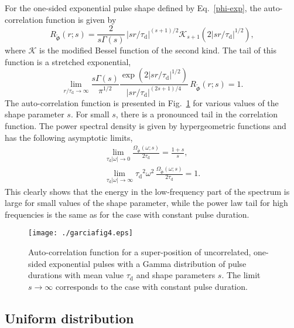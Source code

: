 \documentclass[aps,prb,12pt,a4paper,preprint,amsmath,amssymb,groupedaddress]{revtex4-1}
\newcommand{\abs}[1]{{\left|#1\right|}}\newcommand{\order}[1]{{\mathcal{O}\left(#1\right)}}
\newcommand{\taud}{\ensuremath{\tau_\text{d}}}
\newcommand{\Phiwt}{\ensuremath{\widetilde{\Phi}}}
\newcommand{\Eqref}[1]{Eq.~\eqref{#1}}
\newcommand{\Figref}[1]{Fig.~\ref{#1}}
\begin{document}
For the one-sided exponential pulse shape defined by \Eqref{phi-exp}, the auto-correlation function is given by
\begin{equation}
R_{\Phiwt}(r;s) = \frac{2}{s\Gamma(s)}\,\abs{sr/\taud}^{(s+1)/2} \mathcal{K}_{s+1}(2\abs{sr/\taud}^{1/2}) ,
\end{equation}
where $\mathcal{K}$ is the modified Bessel function of the second kind. The tail of this function is a stretched exponential,
\begin{equation}
\lim_{r/\taud\rightarrow\infty} \frac{s\Gamma(s)}{\pi^{1/2}} \frac{\exp\left( 2\abs{sr/\taud}^{1/2} \right)}{\abs{sr/\taud}^{(2s+1)/4}}\,R_{\Phiwt}(r;s) = 1 .
\end{equation}
The auto-correlation function is presented in \Figref{fig:acf-gamma} for various values of the shape parameter $s$. For small $s$, there is a pronounced tail in the correlation function. The power spectral density is given by hypergeometric functions and has the following asymptotic limits,
\begin{gather}
\lim_{\taud\abs{\omega}\rightarrow0} \frac{\Omega_{\Phiwt}(\omega;s)}{2\taud} = \frac{1+s}{s} ,
\\
\lim_{\taud\abs{\omega}\rightarrow\infty} \taud^2\omega^2\,\frac{\Omega_{\Phiwt}(\omega;s)}{2\taud} = 1 .
\end{gather}
This clearly shows that the energy in the low-frequency part of the spectrum is large for small values of the shape parameter, while the power law tail for high frequencies is the same as for the case with constant pulse duration.


\begin{figure}
\texttt{[image: ./garciafig4.eps]}
\caption{Auto-correlation function for a super-position of uncorrelated, one-sided exponential pulses with a Gamma distribution of pulse durations with mean value $\taud$ and shape parameters $s$. The limit $s\rightarrow\infty$ corresponds to the case with constant pulse duration.}
\label{fig:acf-gamma}
\end{figure}



\subsection{Uniform distribution}
\end{document}
